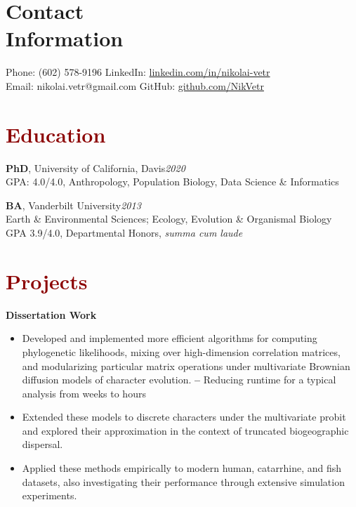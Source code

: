 \documentclass[11pt,margin,line]{resume}
\begin{document}
\name{\huge \textcolor{DarkRed}{Nikolai Vetr}}
\begin{resume}
\vspace{-5mm}
\section{\mysidestyle Contact\\Information}
    Phone: (602) 578-9196       \hfill LinkedIn: \url{linkedin.com/in/nikolai-vetr} \\
\noindent Email: nikolai.vetr@gmail.com  \hfill GitHub: \url{github.com/NikVetr} \vspace{0mm}\\\vspace{-6.5mm}

\section{\large\textcolor{DarkRed}{Education}}
   
\textbf{PhD}, University of California, Davis\hfill\emph{2020}\\
GPA: 4.0/4.0, Anthropology, Population Biology, Data Science \& Informatics
\vspace{-0.25em}

\textbf{BA}, Vanderbilt University\hfill\emph{2013}\\
Earth \& Environmental Sciences; Ecology, Evolution \& Organismal Biology\\
GPA 3.9/4.0, Departmental Honors, \textit{summa cum laude}\\
\vspace{-1.25em}

\section{\large\textcolor{DarkRed}{Projects}}

\textbf{Dissertation Work}
\begin{itemize}[noitemsep]
\item Developed and implemented more efficient algorithms for computing phylogenetic likelihoods, mixing over high-dimension correlation matrices, and modularizing particular matrix operations under multivariate Brownian diffusion models of character evolution.
\subitem \textbf{--} Reducing runtime for a typical analysis from weeks to hours
\item Extended these models to discrete characters under the multivariate probit and explored their approximation in the context of truncated biogeographic dispersal. 
\item Applied these methods empirically to modern human, catarrhine, and fish datasets, also investigating their performance through extensive simulation experiments. 
\end{itemize}


\end{resume}
\end{document}
